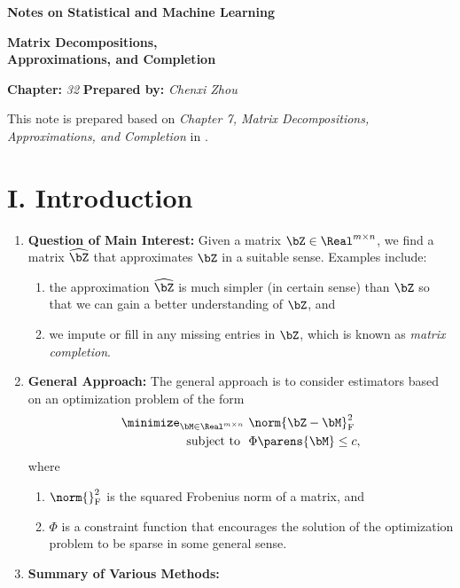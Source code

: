 \documentclass[12pt]{article}
\newcommand{\titlebox}[4]{
\begin{tcolorbox}[colback = blue!5!white!95, colframe = blue!70!black
]
  \noindent \textbf{ #1 } \hfill \textit{#2} 
  \begin{center}
  	 \LARGE{\textbf{#3}}
  \end{center}
\textbf{Chapter:} \textit{#4} \hfill \textbf{Prepared by:} \textit{Chenxi Zhou}
\end{tcolorbox}
}
\begin{document}
\titlebox{Notes on Statistical and Machine Learning}{}{Matrix Decompositions, \\ Approximations, and Completion}{32}
\thispagestyle{plain}

\vspace{10pt}

This note is prepared based on \textit{Chapter 7, Matrix Decompositions, Approximations, and Completion} in \textcite{Hastie2015-rm}. 


\section*{I. Introduction}

\begin{enumerate}[label=\textbf{\arabic*.}]

	\item \textbf{Question of Main Interest:} Given a matrix $\bZ \in \Real^{m \times n}$, we find a matrix $\widehat{\bZ}$ that approximates $\bZ$ in a suitable sense. Examples include: 
	\begin{enumerate}
		\item the approximation $\widehat{\bZ}$ is much simpler (in certain sense) than $\bZ$ so that we can gain a better understanding of $\bZ$, and 
		\item we impute or fill in any missing entries in $\bZ$, which is known as \emph{matrix completion}. 
	\end{enumerate}
	
	\item \textbf{General Approach:} The general approach is to consider estimators based on an optimization problem of the form 
	\begin{align*}
		\minimize_{\bM \in \Real^{m \times n}} & \ \norm{\bZ - \bM}_{\mathrm{F}}^2 \\ 
		\text{subject to } & \ \Phi \parens{\bM} \le c, 
	\end{align*}
	where 
	\begin{enumerate}
		\item $\norm{}_{\mathrm{F}}^2$ is the squared Frobenius norm of a matrix, and 
		\item $\Phi$ is a constraint function that encourages the solution of the optimization problem to be sparse in some general sense.  
	\end{enumerate}
	
	\item \textbf{Summary of Various Methods:} 
	

\end{enumerate}
\end{document}
